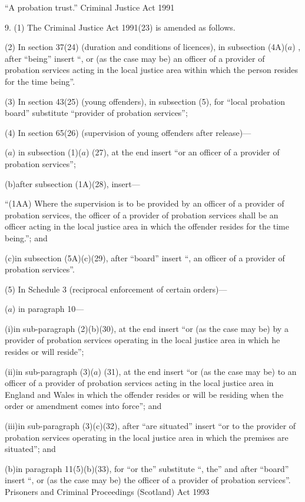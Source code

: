 \documentclass[12pt,a4paper]{article}
\begin{document}
“A probation trust.”
Criminal Justice Act 1991

9.  (1)  The Criminal Justice Act 1991(23) is amended as follows.

(2) In section 37(24) (duration and conditions of licences), in subsection (4A)($a$) , after “being” insert “, or (as the case may be) an officer of a provider of probation services acting in the local justice area within which the person resides for the time being”.

(3) In section 43(25) (young offenders), in subsection (5), for “local probation board” substitute “provider of probation services”;

(4) In section 65(26) (supervision of young offenders after release)—

($a$) in subsection (1)($a$) (27), at the end insert “or an officer of a provider of probation services”;

(b)after subsection (1A)(28), insert—

“(1AA) Where the supervision is to be provided by an officer of a provider of probation services, the officer of a provider of probation services shall be an officer acting in the local justice area in which the offender resides for the time being.”; and

(c)in subsection (5A)(c)(29), after “board” insert “, an officer of a provider of probation services”.

(5) In Schedule 3 (reciprocal enforcement of certain orders)—

($a$) in paragraph 10—

(i)in sub-paragraph (2)(b)(30), at the end insert “or (as the case may be) by a provider of probation services operating in the local justice area in which he resides or will reside”;

(ii)in sub-paragraph (3)($a$) (31), at the end insert “or (as the case may be) to an officer of a provider of probation services acting in the local justice area in England and Wales in which the offender resides or will be residing when the order or amendment comes into force”; and

(iii)in sub-paragraph (3)(c)(32), after “are situated” insert “or to the provider of probation services operating in the local justice area in which the premises are situated”; and

(b)in paragraph 11(5)(b)(33), for “or the” substitute “, the” and after “board” insert “, or (as the case may be) the officer of a provider of probation services”.
Prisoners and Criminal Proceedings (Scotland) Act 1993
\end{document}
